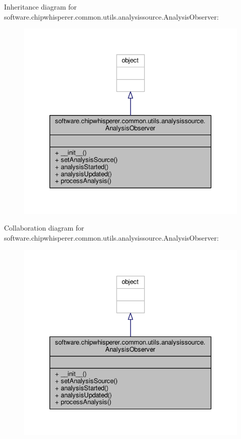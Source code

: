 Inheritance diagram for software.\+chipwhisperer.\+common.\+utils.\+analysissource.\+Analysis\+Observer\+:\nopagebreak
\begin{figure}[H]
\begin{center}
\leavevmode
\includegraphics[width=330pt]{da/db9/classsoftware_1_1chipwhisperer_1_1common_1_1utils_1_1analysissource_1_1AnalysisObserver__inherit__graph}
\end{center}
\end{figure}


Collaboration diagram for software.\+chipwhisperer.\+common.\+utils.\+analysissource.\+Analysis\+Observer\+:\nopagebreak
\begin{figure}[H]
\begin{center}
\leavevmode
\includegraphics[width=330pt]{d2/d82/classsoftware_1_1chipwhisperer_1_1common_1_1utils_1_1analysissource_1_1AnalysisObserver__coll__graph}
\end{center}
\end{figure}


